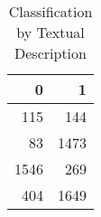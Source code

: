 \begin{table}[!htbp]
\centering
\caption{Classification by Textual Description} 
\label{taba4}
\begin{tabular}{rr}
  \hline
0 & 1 \\ 
  \hline
115 & 144 \\ 
   83 & 1473 \\ 
  1546 & 269 \\ 
  404 & 1649 \\ 
   \hline
\end{tabular}
\end{table}
